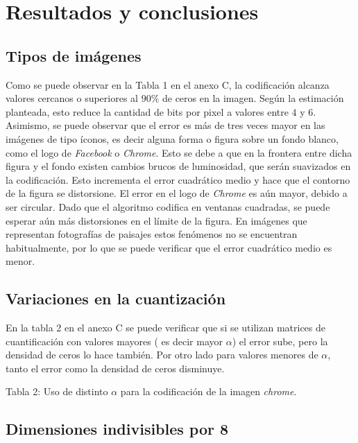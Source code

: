 \documentclass[%
final,
%
reprint,
%
notitlepage,
narroweqnarray,
inline,
twoside,
invited
]{ieee}
\begin{document}
\section{Resultados y conclusiones}

\subsection{Tipos de imágenes}

\par Como se puede observar en la Tabla 1 en el anexo C, la codificación alcanza valores cercanos o superiores al $90\%$ de 
ceros en la imagen. Según la estimación planteada, esto reduce la cantidad de bits por pixel 
 a valores entre $4$ y $6$. Asimismo, se puede observar que el error es más de tres veces mayor en las imágenes de tipo 
íconos, es decir alguna forma o figura sobre un fondo blanco, como el logo de \textit{Facebook} o \textit{Chrome}.
 Esto se debe a que en la frontera entre dicha figura y el fondo existen cambios brucos de luminosidad, 
 que serán suavizados en la codificación. Esto incrementa el error cuadrático medio y hace que 
 el contorno de la figura se distorsione. El error en el logo de \textit{Chrome} es aún mayor, debido a ser  
 circular. Dado que el algoritmo codifica en ventanas cuadradas, se puede esperar aún más distorsiones 
 en el límite de la figura. En imágenes que representan fotografías de paisajes estos fenómenos no se 
 encuentran habitualmente, por lo que se puede verificar que el error cuadrático medio es menor.



\subsection{Variaciones en la cuantización}

\par En la tabla 2 en el anexo C se puede verificar que si se utilizan matrices de cuantificación con valores mayores 
( es decir mayor $\alpha$) el error sube, pero la densidad de ceros lo hace también. Por otro lado para 
valores menores de $\alpha$, tanto el error como la densidad de ceros disminuye.



\begin{center}
Tabla 2: Uso de distinto $\alpha$ para la codificación de la imagen \textit{chrome}.
\end{center}

\subsection{Dimensiones indivisibles por 8}
\end{document}
